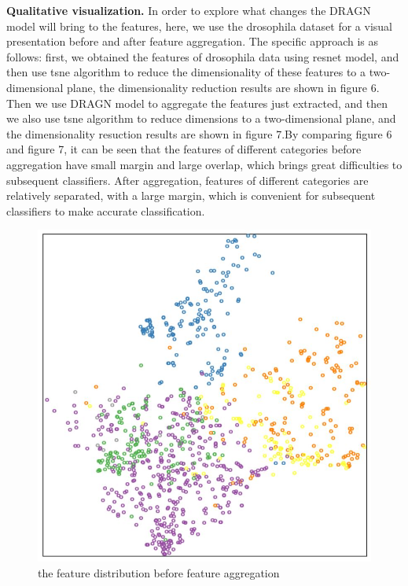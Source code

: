 \documentclass[10pt,twocolumn,letterpaper]{article}
\begin{document}
\textbf{Qualitative visualization.} In order to explore what changes the DRAGN model will bring to the features, here, we use the drosophila dataset for a visual presentation before and after feature aggregation. The specific approach is as follows: first, we obtained the features of drosophila data using resnet model, and then use tsne algorithm to reduce the dimensionality of these features to a two-dimensional plane, the dimensionality reduction results are shown in figure 6. Then we use DRAGN model to aggregate the features just extracted, and then we also use tsne algorithm to reduce dimensions to a two-dimensional plane, and the dimensionality resuction results are shown in figure 7.By comparing figure 6 and figure 7, it can be seen that the features of different categories before aggregation have small margin and large overlap, which brings great difficulties to subsequent classifiers. After aggregation, features of different categories are relatively separated, with a large margin, which is convenient for subsequent classifiers to make accurate classification.

\begin{figure}[t]
\begin{center}
  \includegraphics[width=0.9\linewidth]{original.JPG}
\end{center}
  \caption{the feature distribution before feature aggregation}
\label{fig:long}
\label{fig:onecol}
\end{figure}
\end{document}
